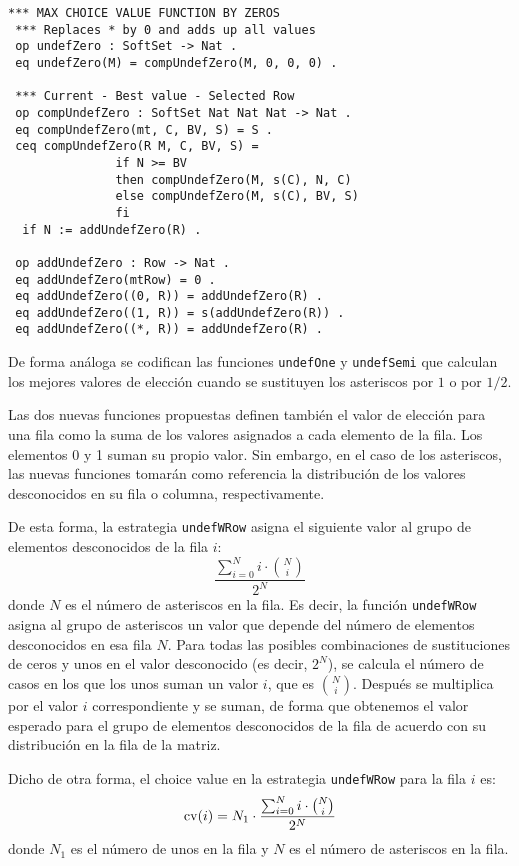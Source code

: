 \begin{lstlisting}[language=Maude]
 *** MAX CHOICE VALUE FUNCTION BY ZEROS
 *** Replaces * by 0 and adds up all values
 op undefZero : SoftSet -> Nat .
 eq undefZero(M) = compUndefZero(M, 0, 0, 0) .

 *** Current - Best value - Selected Row
 op compUndefZero : SoftSet Nat Nat Nat -> Nat .
 eq compUndefZero(mt, C, BV, S) = S .
 ceq compUndefZero(R M, C, BV, S) =
               if N >= BV
               then compUndefZero(M, s(C), N, C)
               else compUndefZero(M, s(C), BV, S)
               fi
  if N := addUndefZero(R) .

 op addUndefZero : Row -> Nat .
 eq addUndefZero(mtRow) = 0 .
 eq addUndefZero((0, R)) = addUndefZero(R) .
 eq addUndefZero((1, R)) = s(addUndefZero(R)) .
 eq addUndefZero((*, R)) = addUndefZero(R) .
\end{lstlisting}
\medskip

De forma análoga se codifican las funciones \texttt{undefOne} y \texttt{undefSemi} que calculan los mejores valores de elección cuando se sustituyen los asteriscos por $1$ o por $1/2$.
\medskip

Las dos nuevas funciones propuestas definen también el valor de elección para una fila como la suma de los valores asignados a cada elemento de la fila. Los elementos 0 y 1 suman su propio valor. Sin embargo, en el caso de los asteriscos, las nuevas funciones tomarán como referencia la distribución de los valores desconocidos en su fila o columna, respectivamente.
\smallskip

De esta forma, la estrategia \texttt{undefWRow} asigna el siguiente valor al grupo de elementos desconocidos de la fila $i$:
$$\frac{\sum_{i=0}^N i\cdot {N\choose i}}{2^N}$$
donde $N$ es el número de asteriscos en la fila.
Es decir, la función \texttt{undefWRow} asigna al grupo de asteriscos un valor que depende del número de elementos desconocidos en esa fila  $N$. Para todas las posibles combinaciones de sustituciones de ceros y unos en el valor desconocido (es decir, $2^N$), se calcula el número de casos en los que los unos suman un valor $i$, que es $N\choose i$. Después se multiplica por el valor $i$ correspondiente y se suman, de forma que obtenemos el valor esperado para el grupo de elementos desconocidos de la fila de acuerdo con su distribución en la fila de la matriz.
\smallskip

Dicho de otra forma, el choice value en la estrategia \texttt{undefWRow} para la fila $i$ es:
$${\rm cv}(i) = N_1 \cdot \frac{\sum_{i=0}^N i\cdot {N\choose i}}{2^N}$$
donde $N_1$ es el número de unos en la fila y $N$ es el número de asteriscos en la fila.
\medskip


